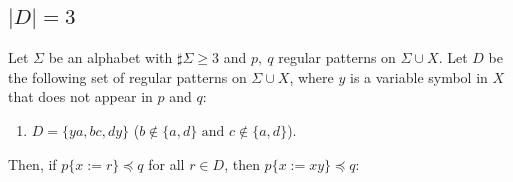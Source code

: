 
\subsection{$|D|=3$}\label{subsec:d3}

\newcommand{\TheConditionA}{$b \not\in \{a,d\} \mbox{~and~} c \not\in \{a,d\}$}
\newcommand{\TheConditionB}{$b = a,~b \not= d, \mbox{~and~} c \not\in \{a,d\}$}
\newcommand{\TheConditionBsub}{$c \not\in \{a,d\}$}
\newcommand{\TheConditionC}{$b \not\in \{a, d\},~c \not= a, \mbox{~and~} c = d$}

\begin{lem}\label{lem:addpart}
  Let $\Sigma$ be an alphabet with $\sharp\Sigma \ge 3$ and $p,~q$ regular patterns on $\Sigma\cup X$.
  Let $D$ be the following set of regular patterns on $\Sigma\cup X$, where $y$ is a variable symbol in $X$ that does not appear in $p$ and $q$:
  \begin{enumerate}
  \item[] $D = \{ ya, bc, dy \}$ (\TheConditionA).
  \end{enumerate}
  Then, if $p \{ x := r \} \preceq q$ for all $r \in D$, then $p \{ x := xy \} \preceq q$:
\end{lem}

